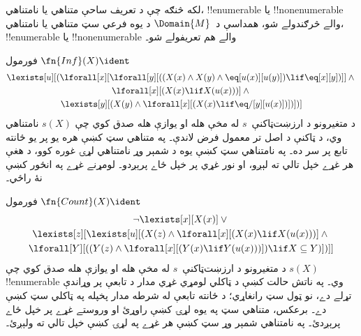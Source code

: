\documentclass[../../../include/open-logic-section]{subfiles}
\begin{document}


\begin{explain}
لکه څنګه چې د تعريف ساحې متناهي يا نامتناهي، !!{enumerable} يا
!!{nonenumerable} والے څرګندولے شو، همداسې د~$\Domain{M}$ د يوه
فرعي سټ متناهي يا نامتناهي، !!{enumerable} يا !!{nonenumerable}
والے هم تعريفولے شو۔
\end{explain}

\begin{prop}
فورمول $\fn{Inf}(X) \ident$
\begin{multline*}
\lexists[u][(\lforall[x][\lforall[y][((X(x)\land X(y)\land \eq[u(x)][u(y)]) \lif
      \eq[x][y])]] \land {} \\\lforall[x][(X(x) \lif X(u(x)))] \land {} \\
\lexists[y][(X(y) \land \lforall[x][(X(x)
      \lif \eq/[y][u(x)])])])]
\end{multline*}
د متغيرونو د ارزښت‌ټاکنې~$s$ له مخې هله او يوازې هله صدق کوي
چې $s(X)$ نامتناهي وي، د ټاکنې د اصل تر معمول فرض لاندې۔ په متناهي سټ کښې هره يو پر يو ځانته تابع پر سر ده۔ په نامتناهي سټ کښې يوه د شمېر وړ نامتناهي لړۍ غوره کوو، د هغې هر غړے خپل تالي ته لېږو، او نور غړي پر خپل ځاے پرېږدو۔ لومړنے غړے په انځور کښې نۀ راځي۔
\end{prop}

\begin{prop}
فورمول $\fn{Count}(X) \ident $
\begin{multline*}
\lnot \lexists[x][X(x)] \lor {} \\
\lexists[z][\lexists[u][(X(z) \land
    \lforall[x][(X(x) \lif X(u(x)))] \land {} \\ \lforall[Y][((Y(z) \land
      \lforall[x][(Y(x) \lif Y(u(x)))]) \lif X \subseteq Y)])]]
\end{multline*}
د متغيرونو د ارزښت‌ټاکنې~$s$ له مخې هله او يوازې هله صدق کوي
چې $s(X)$ !!{enumerable} وي۔ په ناتش حالت کښې د ټاکلي لومړي غړي مدار د تابعې پر وړاندې تړلے دے، نو ټول سټ رانغاړي؛ د ځانته تابعې له شرطه مدار پخپله په ټاکلي سټ کښې دے۔ برعکس، متناهي سټ په يوه لړۍ کښې راوړئ او وروستے غړے پر خپل ځاے پرېږدئ۔ په نامتناهي شمېر وړ سټ کښې هر غړے په لړۍ کښې خپل تالي ته ولېږئ۔
\end{prop}
\end{document}
